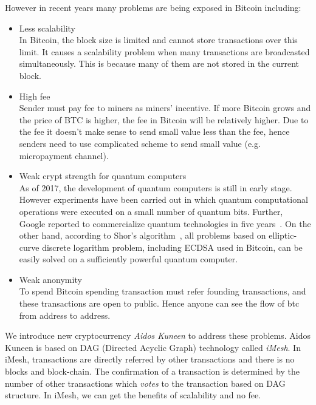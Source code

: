 \documentclass[a4paper,10pt,twocolumn]{article}
\begin{document}
However in recent years many problems are being exposed in Bitcoin including:
\vspace{-0.5\baselineskip}
\begin{itemize}
	\setlength\itemsep{0em}
	\item{Less scalability}\mbox{}\\ 
	In Bitcoin, the block size is limited and cannot store transactions over this limit. It causes a scalability
	problem when many transactions are broadcasted simultaneously. This is because many of them are not stored in the current block.
	\item{High fee}\mbox{}\\ 
	Sender must pay fee to miners as miners' incentive.
	If more Bitcoin grows and the price of BTC is higher, the fee in Bitcoin will be relatively higher.
	Due to the fee it doesn't make sense to send small value less than the fee, hence senders need to use complicated scheme to send small value
(e.g. micropayment channel).
	\item{Weak crypt strength for quantum computers}\mbox{}\\ 
	As of 2017, the development of quantum computers is still in early stage.
	However experiments have been carried out in which quantum computational operations were executed on a small number of quantum bits.
	Further, Google reported to commercialize quantum technologies in five years~\cite{google}.
	On the other hand, according to Shor's algorithm~\cite{shor}, all problems
	based on elliptic-curve discrete logarithm problem, including ECDSA used in Bitcoin, 
	can be easily solved on a sufficiently powerful quantum computer. 
	\item{Weak anonymity}\mbox{}\\ 
	To spend Bitcoin  spending transaction must refer founding transactions, and these transactions are open to public.
	Hence anyone can see the flow of btc from address to address.
\end{itemize}

We introduce new cryptocurrency \emph{Aidos Kuneen} to address these problems.
Aidos Kuneen is based on DAG (Directed Acyclic Graph) technology called \emph{iMesh}.
In iMesh, transactions are directly referred by other transactions and there is no blocks and block-chain.
The confirmation of a transaction is determined by the number of other transactions which \emph{votes}
to the transaction based on DAG structure. In iMesh, we can get the benefits of scalability and no fee.
\end{document}
